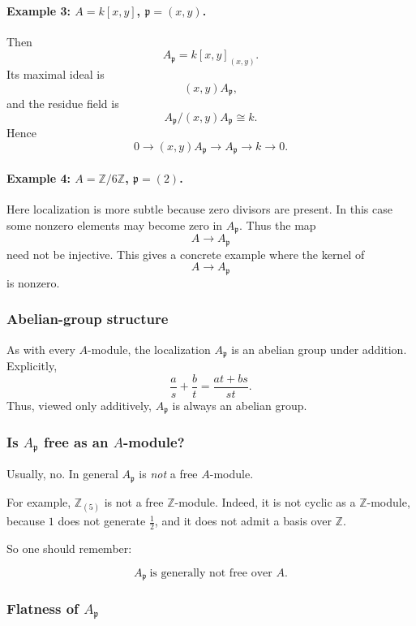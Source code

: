 \documentclass[12pt,a4paper]{article}
\theoremstyle{notespace}
\theoremstyle{definition}
\begin{document}
\paragraph{Example 3: \(A=k[x,y]\), \(\mathfrak p=(x,y)\).}

Then
\[
A_{\mathfrak p}=k[x,y]_{(x,y)}.
\]
Its maximal ideal is
\[
(x,y)A_{\mathfrak p},
\]
and the residue field is
\[
A_{\mathfrak p}/(x,y)A_{\mathfrak p}\cong k.
\]
Hence
\[
0
\longrightarrow
(x,y)A_{\mathfrak p}
\longrightarrow
A_{\mathfrak p}
\longrightarrow
k
\longrightarrow
0.
\]

\paragraph{Example 4: \(A=\mathbb Z/6\mathbb Z\), \(\mathfrak p=(2)\).}

Here localization is more subtle because zero divisors are present. In this case some nonzero elements may become zero in \(A_{\mathfrak p}\). Thus the map
\[
A\longrightarrow A_{\mathfrak p}
\]
need not be injective. This gives a concrete example where the kernel of
\[
A\to A_{\mathfrak p}
\]
is nonzero.

\subsubsection{Abelian-group structure}

As with every \(A\)-module, the localization \(A_{\mathfrak p}\) is an abelian group under addition. Explicitly,
\[
\frac{a}{s}+\frac{b}{t}=\frac{at+bs}{st}.
\]
Thus, viewed only additively, \(A_{\mathfrak p}\) is always an abelian group.

\subsubsection{Is \(A_{\mathfrak p}\) free as an \(A\)-module?}

Usually, no. In general \(A_{\mathfrak p}\) is \emph{not} a free \(A\)-module.

For example, \(\mathbb Z_{(5)}\) is not a free \(\mathbb Z\)-module. Indeed, it is not cyclic as a \(\mathbb Z\)-module, because \(1\) does not generate \(\frac12\), and it does not admit a basis over \(\mathbb Z\).

So one should remember:

\[
A_{\mathfrak p}\ \text{is generally not free over }A.
\]

\subsubsection{Flatness of \(A_{\mathfrak p}\)}
\end{document}
